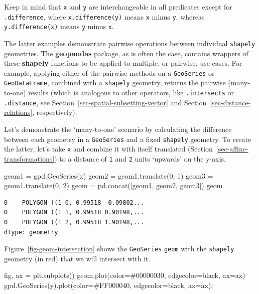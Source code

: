 \documentclass[
  letterpaper,
]{krantz}
\newenvironment{Shaded}{\begin{snugshade}}{\end{snugshade}}
\newcommand{\DecValTok}[1]{\textcolor[rgb]{0.68,0.00,0.00}{#1}}
\newcommand{\NormalTok}[1]{\textcolor[rgb]{0.00,0.23,0.31}{#1}}
\newcommand{\OperatorTok}[1]{\textcolor[rgb]{0.37,0.37,0.37}{#1}}
\newcommand{\StringTok}[1]{\textcolor[rgb]{0.13,0.47,0.30}{#1}}
\begin{document}
Keep in mind that \texttt{x} and \texttt{y} are interchangeable in all
predicates except for \texttt{.difference}, where
\texttt{x.difference(y)} means \texttt{x} minus \texttt{y}, whereas
\texttt{y.difference(x)} means \texttt{y} minus \texttt{x}.

The latter examples demonstrate pairwise operations between individual
\texttt{shapely} geometries. The \textbf{geopandas} package, as is often
the case, contains wrappers of these \textbf{shapely} functions to be
applied to multiple, or pairwise, use cases. For example, applying
either of the pairwise methods on a \texttt{GeoSeries} or
\texttt{GeoDataFrame}, combined with a \texttt{shapely} geometry,
returns the pairwise (many-to-one) results (which is analogous to other
operators, like \texttt{.intersects} or \texttt{.distance}, see
Section~\ref{sec-spatial-subsetting-vector} and
Section~\ref{sec-distance-relations}, respectively).

Let's demonstrate the `many-to-one' scenario by calculating the
difference between each geometry in a \texttt{GeoSeries} and a fixed
\texttt{shapely} geometry. To create the latter, let's take \texttt{x}
and combine it with itself translated
(Section~\ref{sec-affine-transformations}) to a distance of \texttt{1}
and \texttt{2} units `upwards' on the y-axis.

\begin{Shaded}
\begin{Highlighting}[]
\NormalTok{geom1 }\OperatorTok{=}\NormalTok{ gpd.GeoSeries(x)}
\NormalTok{geom2 }\OperatorTok{=}\NormalTok{ geom1.translate(}\DecValTok{0}\NormalTok{, }\DecValTok{1}\NormalTok{)}
\NormalTok{geom3 }\OperatorTok{=}\NormalTok{ geom1.translate(}\DecValTok{0}\NormalTok{, }\DecValTok{2}\NormalTok{)}
\NormalTok{geom }\OperatorTok{=}\NormalTok{ pd.concat([geom1, geom2, geom3])}
\NormalTok{geom}
\end{Highlighting}
\end{Shaded}

\begin{verbatim}
0    POLYGON ((1 0, 0.99518 -0.09802...
0    POLYGON ((1 1, 0.99518 0.90198,...
0    POLYGON ((1 2, 0.99518 1.90198,...
dtype: geometry
\end{verbatim}

Figure~\ref{fig-geom-intersection} shows the \texttt{GeoSeries}
\texttt{geom} with the \texttt{shapely} geometry (in red) that we will
intersect with it.

\begin{Shaded}
\begin{Highlighting}[]
\NormalTok{fig, ax }\OperatorTok{=}\NormalTok{ plt.subplots()}
\NormalTok{geom.plot(color}\OperatorTok{=}\StringTok{\textquotesingle{}\#00000030\textquotesingle{}}\NormalTok{, edgecolor}\OperatorTok{=}\StringTok{\textquotesingle{}black\textquotesingle{}}\NormalTok{, ax}\OperatorTok{=}\NormalTok{ax)}
\NormalTok{gpd.GeoSeries(y).plot(color}\OperatorTok{=}\StringTok{\textquotesingle{}\#FF000040\textquotesingle{}}\NormalTok{, edgecolor}\OperatorTok{=}\StringTok{\textquotesingle{}black\textquotesingle{}}\NormalTok{, ax}\OperatorTok{=}\NormalTok{ax)}\OperatorTok{;}
\end{Highlighting}
\end{Shaded}
\end{document}
